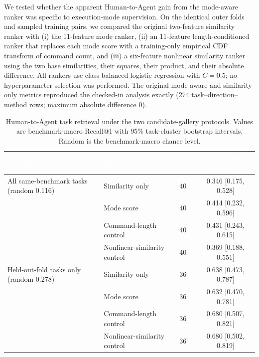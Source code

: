 We tested whether the apparent Human-to-Agent gain from the mode-aware ranker was specific to execution-mode supervision. On the identical outer folds and sampled training pairs, we compared the original two-feature similarity ranker with (i) the 11-feature mode ranker, (ii) an 11-feature length-conditioned ranker that replaces each mode score with a training-only empirical CDF transform of command count, and (iii) a six-feature nonlinear similarity ranker using the two base similarities, their squares, their product, and their absolute difference. All rankers use class-balanced logistic regression with $C=0.5$; no hyperparameter selection was performed. The original mode-aware and similarity-only metrics reproduced the checked-in analysis exactly (274 task--direction--method rows; maximum absolute difference 0).

\begin{table}[tb]
\centering
\caption{Human-to-Agent task retrieval under the two candidate-gallery protocols. Values are benchmark-macro Recall@1 with 95\% task-cluster bootstrap intervals. Random is the benchmark-macro chance level.}
\label{tab:specificity-retrieval}
\footnotesize
\setlength{\tabcolsep}{4pt}
\begin{tabularx}{\linewidth}{>{\raggedright\arraybackslash}Xlcc}
\toprule
\rowcolor{TableInk}
\textcolor{white}{Candidate gallery} & \textcolor{white}{Ranker} & \textcolor{white}{Tasks} & \textcolor{white}{Recall@1 (95\% CI)} \\
\midrule
All same-benchmark tasks (random 0.116) & Similarity only & 40 & 0.346 [0.175, 0.528] \\
\rowcolor{TableMode}
 & Mode score & 40 & 0.414 [0.232, 0.596] \\
\rowcolor{TableControl}
 & Command-length control & 40 & 0.431 [0.243, 0.615] \\
 & Nonlinear-similarity control & 40 & 0.369 [0.188, 0.551] \\
\midrule
Held-out-fold tasks only (random 0.278) & Similarity only & 36 & 0.638 [0.473, 0.787] \\
\rowcolor{TableMode}
 & Mode score & 36 & 0.632 [0.470, 0.781] \\
\rowcolor{TableControl}
 & Command-length control & 36 & 0.680 [0.507, 0.821] \\
 & Nonlinear-similarity control & 36 & 0.680 [0.502, 0.819] \\
\bottomrule
\end{tabularx}
\end{table}

